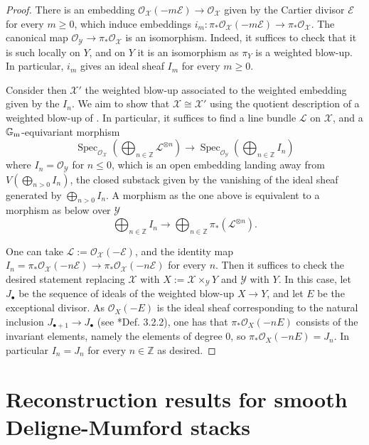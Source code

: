 \documentclass{amsart}
\newcommand{\bG}{\mathbb{G}}
\newcommand{\bZ}{\mathbb{Z}}
\newcommand{\cE}{\mathcal{E}}
\newcommand{\cL}{\mathcal{L}}
\newcommand{\cO}{\mathcal{O}}
\newcommand{\cX}{\mathcal{X}}
\newcommand{\cY}{\mathcal{Y}}
\newcommand{\spec}{\operatorname{Spec}}
\newcommand{\Gm}{\bG_{{\rm m}}}
\theoremstyle{definition}
\begin{document}
\begin{proof}
    There is an embedding $\cO_{\cX}(-m\cE)\to \cO_\cX$ given by the Cartier divisor $\cE$ for every $m\ge 0$,
    which induce embeddings $i_m:\pi_*\cO_{\cX}(-m\cE)\to \pi_*\cO_{\cX}$. The canonical map $\cO_\cY\to \pi_*\cO_\cX$ is an isomorphism. Indeed, it suffices to check that it is such locally on $Y$, and on $Y$ it is an isomorphism as $\pi_Y$ is a weighted blow-up.
    In particular, $i_m$ gives an ideal sheaf $I_m$ for every $m\ge 0$.
    
    Consider then $\cX'$ the weighted blow-up associated to the weighted embedding given by the $I_n$. We aim to show that $\cX\cong \cX'$ using the quotient description of a weighted blow-up of . In particular, it suffices to find a line bundle $\cL$ on $\cX$, and a $\Gm$-equivariant morphism $$\spec_{\cO_\cX}\left(\bigoplus_{n\in \bZ}\cL^{\otimes n}\right)\to \spec_{\cO_\cY}\left(\bigoplus_{n\in \bZ}I_n\right)$$
    where $I_n=\cO_\cY$ for $n\le 0$,
    which is an open embedding landing away from $V(\bigoplus_{n>0}I_n)$, the closed substack given by the vanishing of the ideal sheaf generated by $\bigoplus_{n>0}I_n$. A morphism as the one above is equivalent to a morphism as below over $\cY$
    $$\bigoplus_{n\in \bZ}I_n\to \bigoplus_{n\in \bZ}\pi_*(\cL^{\otimes n}).$$

    One can take $\cL:=\cO_{\cX}(-\cE)$, and the identity map $I_n = \pi_* \cO_{\cX}(-n\cE)\to \pi_* \cO_{\cX}(-n\cE)$ for every $n$. 
    Then it suffices to check the desired statement replacing $\cX$ with $X:=\cX\times_\cY Y$ and $\cY$ with $Y$. 
    In this case, let $J_\bullet$ be the sequence of ideals of the weighted blow-up $X\to Y$, and let $E$ be the exceptional divisor. As $\cO_X(-E)$ is the ideal sheaf corresponding to the natural inclusion $J_{\bullet + 1}\to J_\bullet$ (see \cite{QR}*{Def. 3.2.2}), one has that $\pi_*\cO_X(-nE)$ consists of the invariant elements, namely the elements of degree 0, so $\pi_*\cO_X(-nE) = J_n$. In particular $I_n = J_n$ for every $n\in \bZ$ as desired. 
\end{proof}



 \section{Reconstruction results for smooth Deligne-Mumford stacks}\label{section_prelims}
\end{document}
